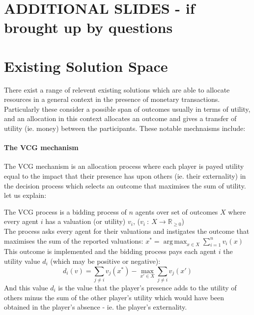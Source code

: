 \documentclass[
10pt, %
a4paper, %
oneside, %
headinclude,footinclude, %
BCOR5mm, %
]{scrartcl}
\DeclareMathOperator*{\argmax}{arg\,max}
\newlength{\dhatheight}
\newcommand{\doublehat}[1]{%
    \settoheight{\dhatheight}{\ensuremath{\hat{#1}}}%
    \addtolength{\dhatheight}{-0.15ex}%
    \hat{\vphantom{\rule{1pt}{\dhatheight}}%
    \smash{\hat{#1}}}}
\begin{document}
\begin{theorem}

\end{theorem}




\section{ADDITIONAL SLIDES - if brought up by questions}




\section{Existing Solution Space}

There exist a range of relevent existing solutions which are able to allocate resources in a general context in the presence of monetary transactions.
Particularly these consider a possible span of outcomes usually in terms of utility, and an allocation in this context allocates an outcome and gives a transfer of utility (ie. money) between the participants.
These notable mechnaisms include:

\paragraph{The VCG mechanism}
The VCG mechanism is an allocation process where each player is payed utility equal to the impact that their presence has upon others (ie. their externality) in the decision process which selects an outcome that maximises the sum of utility. let us explain:

The VCG process is a bidding process of $n$ agents over set of outcomes $X$ where every agent $i$ has a valuation (or utility) $v_i$,
($ v_i~:~X\rightarrow \mathbb{R}_{\ge 0} $)\\
The process asks every agent for their valuations and instigates the outcome that maximises the sum of the reported valuations:
$ x^* = \argmax_{x\in X}\sum_{i=1}^{n}v_i(x) $\\
This outcome is implemented and the bidding process pays each agent $i$ the utility value $d_i$ (which may be positive or negative):
\begin{equation}\label{eq:VCG_payment_rule} d_i(v)=\sum_{j\ne i}v_j(x^*) - \max_{x'\in X}\sum_{j\ne i}v_j(x') \end{equation}
And this value $d_i$ is the value that the player's presence adds to the utility of others minus the sum of the other player's utility which would have been obtained in the player's absence - ie. the player's externality.
\end{document}
